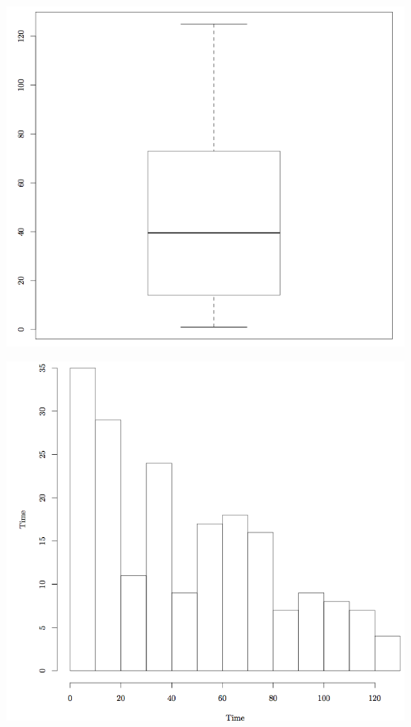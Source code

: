 \documentclass[]{report}
\begin{document}
\begin{center}
	\includegraphics[width=0.8\linewidth]{Figures/time_boxplot}
	\label{fig:time_boxplot}
\end{center}

\begin{center}
	\includegraphics[width=0.8\linewidth]{Figures/time_hist}
	\label{fig:time_hist}
\end{center}
\end{document}
